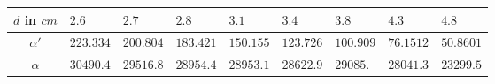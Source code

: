\begin{tabular}{c|*{8}{*{1}{l}}}
$d$ in ${\si{cm}}$ & $2.6$ & $2.7$ & $2.8$ & $3.1$ & $3.4$ & $3.8$ & $4.3$ & $4.8$ \\ \hline
$\alpha'$ & $223.334$ & $200.804$ & $183.421$ & $150.155$ & $123.726$ & $100.909$ & $76.1512$ & $50.8601$ \\ \hline
$\alpha$ & $30490.4$ & $29516.8$ & $28954.4$ & $28953.1$ & $28622.9$ & $29085.$ & $28041.3$ & $23299.5$\end{tabular}
